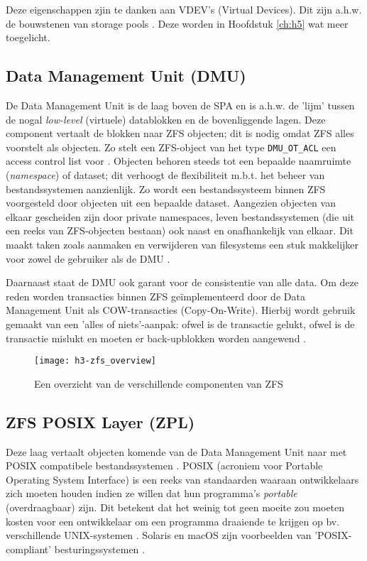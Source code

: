 Deze eigenschappen zjin te danken aan VDEV's (Virtual Devices). Dit zijn a.h.w. de bouwstenen van storage pools \autocite{Lucas2015}. Deze worden in Hoofdstuk \ref{ch:h5} wat meer toegelicht.

\subsection{Data Management Unit (DMU)}

De Data Management Unit is de laag boven de SPA en is a.h.w. de 'lijm' tussen de nogal \textit{low-level} (virtuele) datablokken en de bovenliggende lagen. Deze component vertaalt de blokken naar ZFS objecten; dit is nodig omdat ZFS alles voorstelt als objecten. Zo stelt een ZFS-object van het type \texttt{DMU\_OT\_ACL} een access control list voor \autocite{Microsystems2006}. Objecten behoren steeds tot een bepaalde naamruimte (\textit{namespace}) of dataset; dit verhoogt de flexibiliteit m.b.t. het beheer van bestandssystemen aanzienlijk. Zo wordt een bestandssysteem binnen ZFS voorgesteld door objecten uit een bepaalde dataset. Aangezien objecten van elkaar gescheiden zijn door private namespaces, leven bestandssystemen (die uit een reeks van ZFS-objecten bestaan) ook naast en onafhankelijk van elkaar. Dit maakt taken zoals aanmaken en verwijderen van filesystems een stuk makkelijker voor zowel de gebruiker als de DMU \autocite{ZFSBonwick}.   

Daarnaast staat de DMU ook garant voor de consistentie van alle data. Om deze reden worden transacties binnen ZFS geïmplementeerd door de Data Management Unit als COW-transacties (Copy-On-Write). Hierbij wordt gebruik gemaakt van een 'alles of niets'-aanpak: ofwel is de transactie gelukt, ofwel is de transactie mislukt en moeten er back-upblokken worden aangewend \autocite{ZFSBonwick}.

\begin{figure}
        \centering
        \texttt{[image: h3-zfs\_overview]}
        \caption{Een overzicht van de verschillende componenten van ZFS \autocite{KendiOnbekend}}
        \label{fig:kendi_zfs_overview}
\end{figure}

\subsection{ZFS POSIX Layer (ZPL)}

Deze laag vertaalt objecten komende van de Data Management Unit naar met POSIX compatibele bestandssystemen \autocite{ZFSBonwick}. POSIX (acroniem voor Portable Operating System Interface) is een reeks van standaarden waaraan ontwikkelaars zich moeten houden indien ze willen dat hun programma's \textit{portable} (overdraagbaar) zijn. Dit betekent dat het weinig tot geen moeite zou moeten kosten voor een ontwikkelaar om een programma draaiende te krijgen op bv. verschillende UNIX-systemen \autocite{IEEE2016}. Solaris en macOS zijn voorbeelden van 'POSIX-compliant' besturingssystemen \autocite{GroupOnbekend}.

